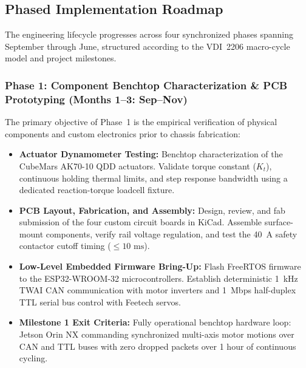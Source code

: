 \subsection{Phased Implementation Roadmap}
The engineering lifecycle progresses across four synchronized phases spanning September through June, structured according to the VDI~2206 macro-cycle model and project milestones.

\subsubsection{Phase 1: Component Benchtop Characterization \& PCB Prototyping (Months 1--3: Sep--Nov)}
The primary objective of Phase~1 is the empirical verification of physical components and custom electronics prior to chassis fabrication:
\begin{itemize}[leftmargin=1.5em]
  \item \textbf{Actuator Dynamometer Testing:} Benchtop characterization of the CubeMars AK70-10 QDD actuators. Validate torque constant ($K_t$), continuous holding thermal limits, and step response bandwidth using a dedicated reaction-torque loadcell fixture.
  \item \textbf{PCB Layout, Fabrication, and Assembly:} Design, review, and fab submission of the four custom circuit boards in KiCad. Assemble surface-mount components, verify rail voltage regulation, and test the 40~A safety contactor cutoff timing ($\le 10\text{ ms}$).
  \item \textbf{Low-Level Embedded Firmware Bring-Up:} Flash FreeRTOS firmware to the ESP32-WROOM-32 microcontrollers. Establish deterministic 1~kHz TWAI CAN communication with motor inverters and 1~Mbps half-duplex TTL serial bus control with Feetech servos.
  \item \textbf{Milestone 1 Exit Criteria:} Fully operational benchtop hardware loop: Jetson Orin NX commanding synchronized multi-axis motor motions over CAN and TTL buses with zero dropped packets over 1 hour of continuous cycling.
\end{itemize}

